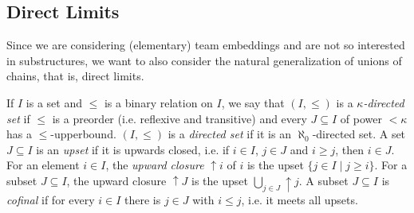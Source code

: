 \documentclass[a4paper]{amsart}
\theoremstyle{definition}
\theoremstyle{remark}
\theoremstyle{definition}
\DeclareMathOperator{\upset}{\uparrow}
\begin{document}
\subsection{Direct Limits}\label{colimits.subsection}

Since we are considering (elementary) team embeddings and are not so interested in substructures, we want to also consider the natural generalization of unions of chains, that is, direct limits.

If $I$ is a set and $\leq$ is a binary relation on $I$, we say that $(I,\leq)$ is a \emph{$\kappa$-directed set} if $\leq$ is a preorder (i.e. reflexive and transitive) and every $J\subseteq I$ of power $<\kappa$ has a $\leq$-upperbound. $(I,\leq)$ is a \emph{directed set} if it is an $\aleph_0$-directed set. A set $J\subseteq I$ is an \emph{upset} if it is upwards closed, i.e. if $i\in I$, $j\in J$ and $i\geq j$, then $i\in J$. For an element $i\in I$, the \emph{upward closure} $\upset i$ of $i$ is the upset $\{j\in I \mid j\geq i\}$. For a subset $J\subseteq I$, the upward closure $\upset J$ is the upset $\bigcup_{j\in J}\upset j$. A subset $J\subseteq I$ is \emph{cofinal} if for every $i\in I$ there is $j\in J$ with $i\leq j$, i.e. it meets all upsets.
\end{document}
